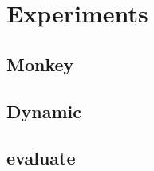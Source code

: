 
\chapter{Experiments}\label{ch:experiments}

\section{Monkey}


\section{Dynamic}


\section{evaluate}


